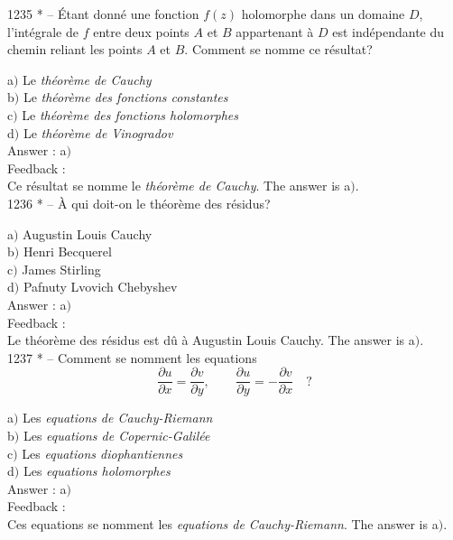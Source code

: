 \documentclass[letterpaper, 12pt]{article}
\begin{document}
1235 * -- \'Etant donn\'e une fonction $f(z)$ holomorphe dans un
domaine $D$, l'int\'egrale de $f$ entre deux points $A$ et $B$
appartenant \`a $D$ est ind\'ependante du chemin reliant les points
$A$ et $B$. Comment se nomme ce r\'esultat?

a$)$ Le {\sl th\'eor\`eme de Cauchy} \\
b$)$ Le {\sl th\'eor\`eme des fonctions constantes} \\
c$)$ Le {\sl th\'eor\`eme des fonctions holomorphes} \\
d$)$ Le {\sl th\'eor\`eme de Vinogradov}\\

Answer : a$)$\\

Feedback : \\
Ce r\'esultat se nomme le {\sl th\'eor\`eme de Cauchy}.
The answer is a$)$.\\

1236 * -- \`A qui doit-on le th\'eor\`eme des r\'esidus?

a$)$ Augustin Louis Cauchy \\
b$)$ Henri Becquerel \\
c$)$ James Stirling \\
d$)$ Pafnuty Lvovich Chebyshev\\

Answer : a$)$\\

Feedback : \\
Le th\'eor\`eme des r\'esidus est d\^u \`a Augustin Louis Cauchy.
The answer is a$)$.\\

1237 * -- Comment se nomment les equations
$$\displaystyle{\frac{\partial u}{\partial x}=\frac{\partial v}{\partial
y},\quad\quad\frac{\partial u}{\partial y}=-\frac{\partial v}{\partial
x}}\quad?$$

a$)$ Les {\sl equations de Cauchy-Riemann} \\
b$)$ Les {\sl equations de Copernic-Galil\'ee} \\
c$)$ Les {\sl equations diophantiennes} \\
d$)$ Les {\sl equations holomorphes}\\

Answer : a$)$\\

Feedback : \\
Ces equations se nomment les {\sl equations de Cauchy-Riemann}.
The answer is a$)$.\\
\end{document}

